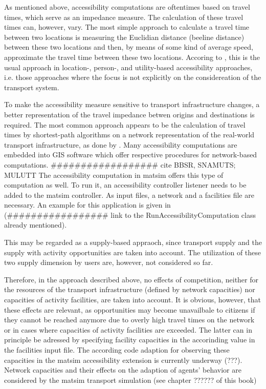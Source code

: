 As mentioned above, accessibility computations are oftentimes based on travel times, which serve as an impedance 
measure. The calculation of these travel times can, however, vary. The most simple approach to calculate a travel time 
between two locations is measuring the Euclidian distance (beeline distance) between these two locations and then, 
by means of some kind of average speed, approximate the travel time between these two locations. Accoring to 
\citet{Geurs2004AccessibilityReview}, this is the usual approach in location-, person-, and utility-based accessibility 
approaches, i.e. those approaches where the focus is not explicitly on the considereation of the transport system.

To make the accessibility measure sensitive to transport infrastructure changes, a better representation of the travel 
impedance betwen origins and destinations is required. The most common approach appears to be the calculation of travel 
times by shortest-path algorithms on a network representation of the real-world transport infrastructure, as \eg done by \citet{BBSR20xxErreichbarkeitsmodell}.
Many accessibility computations are embedded into GIS software which offer respective procedures for network-based 
computations. 
################## cite BBSR, SNAMUTS; MULUTT
The accessibility computation in \gls{matsim} offers this type of computation as well. To run it, an 
accessibility controller listener needs to be added to the \gls{matsim} controller. As input files, a network and a 
facilities file are necessary. An example for this application is given in 
(################# link to the RunAccessibilityComputation 
class already mentioned).

This may be regarded as a supply-based appraoch, since transport supply and the supply with activity opportunities are 
taken into account. The utilization of these two supply dimension by users are, however, not considered so far.

Therefore, in the approach described above, no effects of competition, neither for the resources 
of the transport infrastructure (defined by network capacities) nor capacities of activity facilities, 
are taken into account. It is obvious, however, that these effects are relevant, as opportunities 
may become unavailbale to citizens if they cannot be reached anymore due to overly high travel times 
on the network or in cases where capacities of activity facilities are exceeded. The latter can in 
principle be adressed by specifying facility capacities in the accorinding value in the facilities 
input file. The according code adaption for observing these capacities in the \gls{matsim} 
accessibility extension is currently underway  (???). Network capacities and their effects on 
the adaption of agents' behavior are considered by the \gls{matsim} transport simulation 
(see chapter ?????? of this book)

